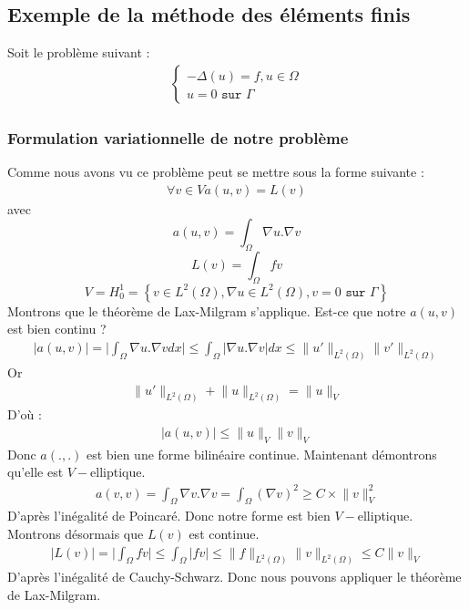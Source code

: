 \subsection{Exemple de la méthode des éléments finis}
Soit le problème suivant :
\begin{align*}
\left\{\begin{matrix}
-\Delta\left(u\right)=f,  u\in\Omega\\
u=0 \texttt{ sur }\Gamma
\end{matrix}
 \right.
\end{align*}
\subsubsection{Formulation variationnelle de notre problème}
Comme nous avons vu ce problème peut se mettre sous la forme suivante :
\begin{align*}
\forall v\in V a(u,v)=L(v)
\end{align*}
avec
\begin{equation*}
a(u,v)=\int_{\Omega}\nabla u.\nabla v
\end{equation*}
\begin{equation*}
L(v)=\int_{\Omega}fv
\end{equation*}
\begin{equation*}
V=H_{0}^{1}=\left\{v\in L^{2}\left(\Omega\right), \nabla u\in L^{2}\left(\Omega\right), v=0 \texttt{ sur }\Gamma\right\}
\end{equation*}
Montrons que le théorème de Lax-Milgram s'applique.
Est-ce que notre $a(u,v)$ est bien continu ?
\begin{align*}
\lvert a\left( u,v\right)\rvert=\lvert \int_{\Omega}\nabla u.\nabla v dx\rvert\leq \int_{\Omega} \lvert\nabla u.\nabla v\rvert dx \leq \lVert u'\rVert_{L^{2}\left(\Omega\right)}\lVert v'\rVert_{L^{2}\left(\Omega\right)}
\end{align*}
Or
\begin{align*}
\lVert u'\rVert_{L^{2}\left(\Omega\right)}+\lVert u\rVert_{L^{2}\left(\Omega\right)}=\lVert u\rVert_{V}
\end{align*}
D'où :
\begin{align*}
\lvert a\left( u,v\right)\rvert\leq \lVert u \rVert_{V}\lVert v \rVert_{V}
\end{align*}
Donc $a\left(.,.\right)$ est bien une forme bilinéaire continue. Maintenant démontrons qu'elle est $V-$elliptique.
\begin{align*}
a(v,v)=\int_{\Omega}\nabla v.\nabla v=\int_{\Omega} \left(\nabla v\right)^{2}\geq C\times \lVert v\rVert_{V}^{2}
\end{align*}
D'après l'inégalité de Poincaré. Donc notre forme est bien $V-$elliptique. Montrons désormais que $L(v)$ est continue.
\begin{align*}
\lvert L(v)\rvert=\lvert\int_{\Omega}fv\rvert\leq \int_{\Omega}\lvert fv\rvert \leq \lVert f\rVert_{L^{2}(\Omega)}\lVert v\rVert_{L^{2}(\Omega)}\leq C \lVert v\rVert_{V}
\end{align*}
D'après l'inégalité de Cauchy-Schwarz. Donc nous pouvons appliquer le théorème de Lax-Milgram.
